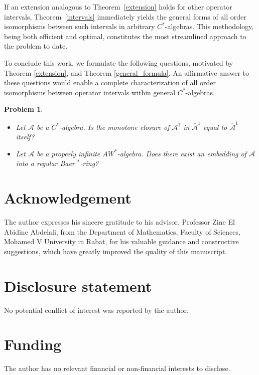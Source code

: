\documentclass[12pt]{amsart}
\newtheorem{prob}[thm]{Problem}
\theoremstyle{definition}
\theoremstyle{remark}
\numberwithin{equation}{section}
\begin{document}
If an extension analogous to Theorem~\ref{extension} holds for other operator intervals, Theorem~\ref{intervals}  
immediately yields the general forms of all order isomorphisms between such intervals in arbitrary $C^*$-algebras.   This methodology, being both efficient and optimal, constitutes the most streamlined approach to the problem to date. 

 
To conclude this work, we formulate the following questions, motivated by   Theorem \ref{extension},
and  Theorem \ref{general_formula}.  
An affirmative answer to these questions would enable a complete characterization  
of all order isomorphisms between operator intervals within general $C^*$-algebras.  

\begin{prob}\label{final-questions}  
	\begin{itemize}  
		\item Let $\mathcal{A}$ be a $C^*$-algebra. Is the monotone closure of $\mathcal{A}^1$ in $\overline{\mathcal{A}}^1$ equal to $\overline{\mathcal{A}}^1$ itself?  
		
		\item Let $\mathcal{A}$ be a properly infinite $AW^*$-algebra. Does there exist  
		an embedding of $\mathcal{A}$ into a regular Baer $^*$-ring?  
	\end{itemize}  
\end{prob}   




\section*{Acknowledgement}
The author expresses his sincere gratitude to his advisor, Professor Zine El Abidine Abdelali, from the Department of Mathematics, Faculty of Sciences, Mohamed V University in Rabat, for his valuable guidance and constructive suggestions, which have greatly improved the quality of this manuscript.


\section*{Disclosure statement}
No potential conflict of interest was reported by the author.

\section*{Funding }
The author has no relevant financial or non-financial interests to disclose.
\end{document}
